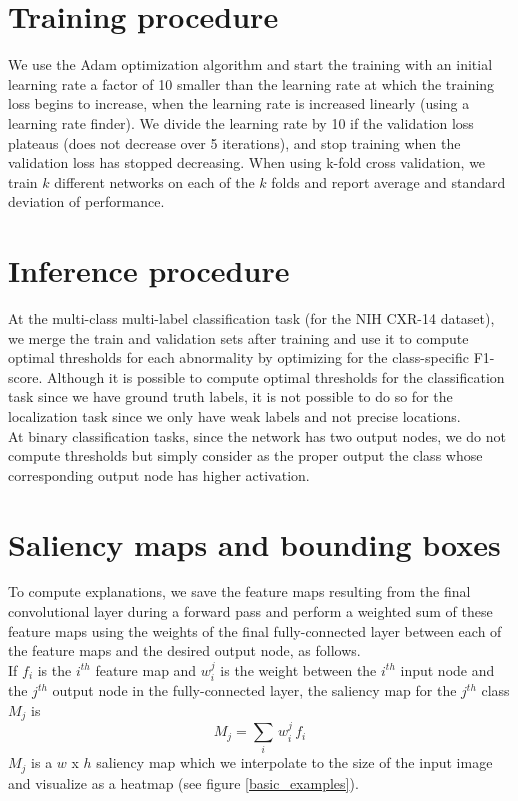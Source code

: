 \documentclass[12pt,oneside,a4paper]{report}
\begin{document}
\section{Training procedure\label{training_procedure}}
We use the Adam optimization algorithm and start the training with an initial
learning rate a factor of 10 smaller than the learning rate at which the
training loss begins to increase, when the learning rate is increased linearly
(using a learning rate finder). We divide the learning rate by 10 if the
validation loss plateaus (does not decrease over 5 iterations), and stop
training when the validation loss has stopped decreasing. When using k-fold
cross validation, we train $k$ different networks on each of the $k$ folds and
report average and standard deviation
of performance.\\

\section{Inference procedure\label{inference_procedure}}
At the multi-class multi-label classification task (for the NIH CXR-14 dataset),
we merge the train and validation sets after training and use it to compute
optimal thresholds for each abnormality by optimizing for the class-specific
F1-score. Although it is possible to compute optimal thresholds for the
classification task since we have ground truth labels, it is not possible to do
so for the localization task since
we only have weak labels and not precise locations.\\

At binary classification tasks, since the network has two output nodes, we do
not compute thresholds but simply consider as the proper output the class whose
corresponding output node has higher activation.

\section{Saliency maps and bounding boxes}
To compute explanations, we save the feature maps resulting from the final
convolutional layer during a forward pass and perform a weighted sum of these
feature maps using the weights of the final fully-connected layer between
each of the feature maps and the desired output node, as follows.\\

If $f_i$ is the $i^{th}$ feature map and $w^j _i$ is the weight between the
$i^{th}$ input node and the $j^{th}$ output node in the fully-connected layer,
the saliency map for the $j^{th}$ class $M_j$ is
\begin{equation}
  M_j = \sum _i \, w^j _i \, f_i
\end{equation}
$M_j$ is a $w$ x $h$ saliency map which we interpolate to the size of the input
image and visualize as a heatmap (see figure \ref{basic_examples}).\\
\end{document}
